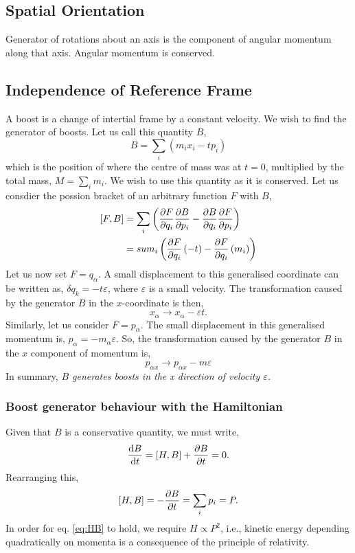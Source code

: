 \documentclass{book}
\begin{document}
\subsection{Spatial Orientation}
Generator of rotations about an axis is the component of angular momentum along that axis. Angular momentum is conserved.
\subsection{Independence of Reference Frame}
A boost is a change of intertial frame by a constant velocity. We wish to find the generator of boosts. Let us call this quantity $B$,
\begin{equation}
	\boxed{B = \sum_i\left(m_ix_i - tp_i\right)}
\end{equation}
which is the position of where the centre of mass was at $t=0$, multiplied by the total mass, $M = \sum_i m_i$. We wish to use this quantity as it is conserved. Let us consdier the possion bracket of an arbitrary function $F$ with $B$,
\begin{equation}
	\begin{split}
		\left[F,B\right] & = \sum_i\left(\pdv{F}{q_i}\pdv{B}{p_i} - \pdv{B}{q_i}\pdv{F}{p_i}\right) \\ 
		& = sum_i\left(\pdv{F}{q_i}\left(-t\right) - \pdv{F}{q_i}\left(m_i\right)\right)
	\end{split}
\end{equation}
Let us now set $F = q_{\alpha}$. A small displacement to this generalised coordinate can be written as, $\delta q_k = -t\varepsilon$, where $\varepsilon$ is a small velocity. The transformation caused by the generator $B$ in the $x$-coordinate is then,
\begin{equation}
	x_{\alpha} \to x_{\alpha} - \varepsilon t.
\end{equation}
Similarly, let us consider $F = p_{\alpha}$. The small displacement in this generalised momentum is, $p_{\alpha} = -m_{\alpha}\varepsilon$. So, the transformation caused by the generator $B$ in the $x$ component of momentum is,
\begin{equation}
	p_{\alpha x} \to p_{\alpha x} - m\varepsilon
\end{equation}
In summary, \textit{$B$ generates boosts in the x direction of velocity $\varepsilon$.}
\subsubsection{Boost generator behaviour with the Hamiltonian}
Given that $B$ is a conservative quantity, we must write,
\begin{equation}
	\dv{B}{t} = \left[H,B\right] + \pdv{B}{t} = 0.
\end{equation}
Rearranging this,
\begin{equation}
	\left[H,B\right] = -\pdv{B}{t} = \sum_ip_i = P. \label{eq:HB}
\end{equation}
In order for eq. \eqref{eq:HB} to hold, we require $H \propto P^2$, i.e., kinetic energy depending quadratically on momenta is a consequence of the principle of relativity.
\appendix
\end{document}
